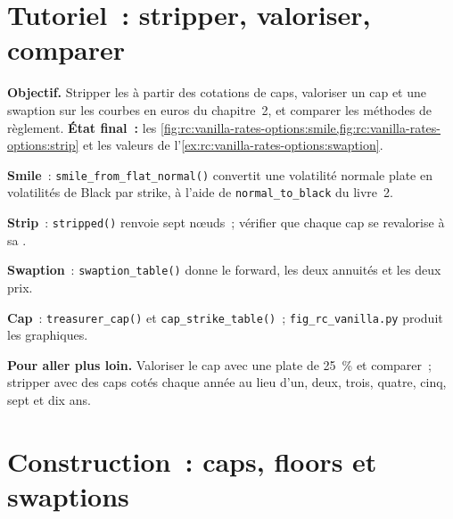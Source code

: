 \section{Tutoriel~: stripper, valoriser, comparer}\label{tut:rc:vanilla-rates-options:tutorial}

\begin{tutorial}
\textbf{Objectif.} Stripper les  à partir des cotations de caps, valoriser un cap et une
swaption sur les courbes en euros du chapitre~2, et comparer les méthodes de règlement.
\textbf{État final~:}
les \cref{fig:rc:vanilla-rates-options:smile,fig:rc:vanilla-rates-options:strip} et les
valeurs de l'\cref{ex:rc:vanilla-rates-options:swaption}.
\begin{tutsteps}
\item \textbf{Smile}~: \texttt{smile\_from\_flat\_normal()} convertit une volatilité normale plate
en volatilités de Black par strike, à l'aide de
\texttt{normal\_to\_black} du livre~2.
\item \textbf{Strip}~: \texttt{stripped()} renvoie sept nœuds~; vérifier que chaque
cap se revalorise à sa .
\item \textbf{Swaption}~: \texttt{swaption\_table()} donne le forward, les deux
annuités et les deux prix.
\item \textbf{Cap}~: \texttt{treasurer\_cap()} et \texttt{cap\_strike\_table()}~;
\texttt{fig\_rc\_vanilla.py} produit les graphiques.
\end{tutsteps}
\textbf{Pour aller plus loin.} Valoriser le cap avec une  plate de
25~\% et comparer~; stripper avec des caps cotés chaque année au lieu d'un, deux,
trois, quatre, cinq, sept et dix ans.
\end{tutorial}

\section{Construction~: caps, floors et swaptions}\label{bld:rc:vanilla-rates-options:capfloor}

